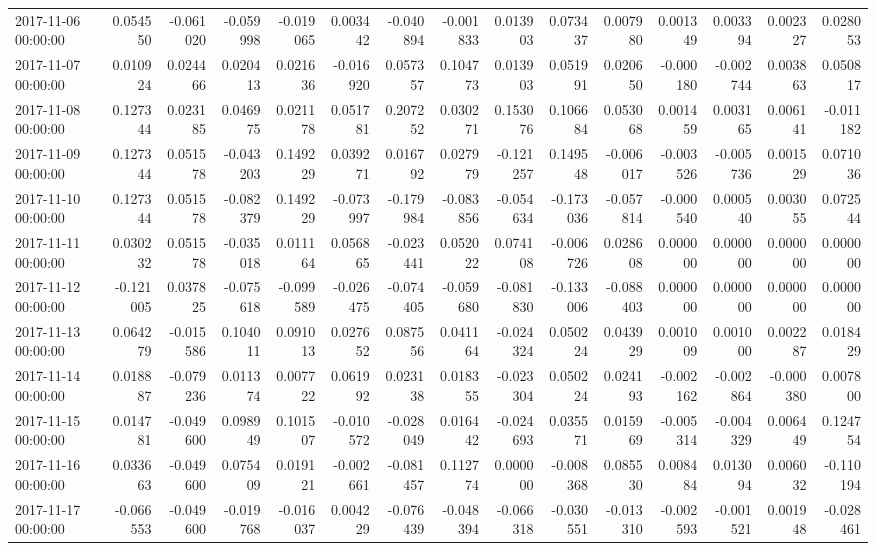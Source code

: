 \begin{tabular}{lrrrrrrrrrrrrrr}
2017-11-06 00:00:00 & 0.054550 & -0.061020 & -0.059998 & -0.019065 & 0.003442 & -0.040894 & -0.001833 & 0.013903 & 0.073437 & 0.007980 & 0.001349 & 0.003394 & 0.002327 & 0.028053 \\
2017-11-07 00:00:00 & 0.010924 & 0.024466 & 0.020413 & 0.021636 & -0.016920 & 0.057357 & 0.104773 & 0.013903 & 0.051991 & 0.020650 & -0.000180 & -0.002744 & 0.003863 & 0.050817 \\
2017-11-08 00:00:00 & 0.127344 & 0.023185 & 0.046975 & 0.021178 & 0.051781 & 0.207252 & 0.030271 & 0.153076 & 0.106684 & 0.053068 & 0.001459 & 0.003165 & 0.006141 & -0.011182 \\
2017-11-09 00:00:00 & 0.127344 & 0.051578 & -0.043203 & 0.149229 & 0.039271 & 0.016792 & 0.027979 & -0.121257 & 0.149548 & -0.006017 & -0.003526 & -0.005736 & 0.001529 & 0.071036 \\
2017-11-10 00:00:00 & 0.127344 & 0.051578 & -0.082379 & 0.149229 & -0.073997 & -0.179984 & -0.083856 & -0.054634 & -0.173036 & -0.057814 & -0.000540 & 0.000540 & 0.003055 & 0.072544 \\
2017-11-11 00:00:00 & 0.030232 & 0.051578 & -0.035018 & 0.011164 & 0.056865 & -0.023441 & 0.052022 & 0.074108 & -0.006726 & 0.028608 & 0.000000 & 0.000000 & 0.000000 & 0.000000 \\
2017-11-12 00:00:00 & -0.121005 & 0.037825 & -0.075618 & -0.099589 & -0.026475 & -0.074405 & -0.059680 & -0.081830 & -0.133006 & -0.088403 & 0.000000 & 0.000000 & 0.000000 & 0.000000 \\
2017-11-13 00:00:00 & 0.064279 & -0.015586 & 0.104011 & 0.091013 & 0.027652 & 0.087556 & 0.041164 & -0.024324 & 0.050224 & 0.043929 & 0.001009 & 0.001000 & 0.002287 & 0.018429 \\
2017-11-14 00:00:00 & 0.018887 & -0.079236 & 0.011374 & 0.007722 & 0.061992 & 0.023138 & 0.018355 & -0.023304 & 0.050224 & 0.024193 & -0.002162 & -0.002864 & -0.000380 & 0.007800 \\
2017-11-15 00:00:00 & 0.014781 & -0.049600 & 0.098949 & 0.101507 & -0.010572 & -0.028049 & 0.016442 & -0.024693 & 0.035571 & 0.015969 & -0.005314 & -0.004329 & 0.006449 & 0.124754 \\
2017-11-16 00:00:00 & 0.033663 & -0.049600 & 0.075409 & 0.019121 & -0.002661 & -0.081457 & 0.112774 & 0.000000 & -0.008368 & 0.085530 & 0.008484 & 0.013094 & 0.006032 & -0.110194 \\
2017-11-17 00:00:00 & -0.066553 & -0.049600 & -0.019768 & -0.016037 & 0.004229 & -0.076439 & -0.048394 & -0.066318 & -0.030551 & -0.013310 & -0.002593 & -0.001521 & 0.001948 & -0.028461 \\

\end{tabular}
